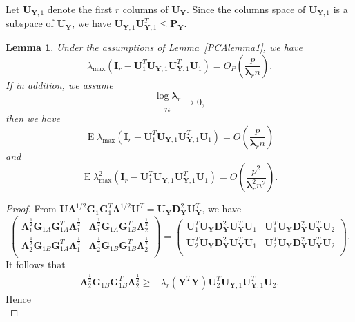 \documentclass[12pt]{article} %
\DeclareMathOperator{\myE}{E}
\newcommand{\bP}{\mathbf{P}}
\newcommand{\bY}{\mathbf{Y}}
\newcommand{\bG}{\mathbf{G}}
\newcommand{\bI}{\mathbf{I}}
\newcommand{\bU}{\mathbf{U}}
\newcommand{\bD}{\mathbf{D}}
\newcommand{\bfsym}[1]{\ensuremath{\boldsymbol{#1}}}
\def\blambda {\bfsym {\lambda}}
\def\bLambda {\bfsym {\Lambda}}
\newtheorem{lemma}{Lemma}
\theoremstyle{definition}
\begin{document}
\begin{appendices}
Let $\bU_{\bY,1}$ denote the first $r$ columns of $\bU_{\bY}$.
Since the columns space of $\bU_{\bY,1}$ is a subspace of $\bU_{\bY}$, we have $\bU_{\bY,1}\bU_{\bY,1}^T\leq \bP_{\bY}$.
\begin{lemma}\label{PCAlemma2}
    Under the assumptions of Lemma~\ref{PCAlemma1}, we have
$$
\lambda_{\max}(\bI_r-\bU_1^T \bU_{\bY,1}\bU_{\bY,1}^T \bU_1)
=O_P(\frac{ p}{\blambda_r n}).
$$
If in addition, we assume
    \begin{equation}\label{newCondition}
        \frac{\log \blambda_r}{n}\to 0,
    \end{equation}
     then we have
$$
\myE\lambda_{\max}(\bI_r-\bU_1^T \bU_{\bY,1}\bU_{\bY,1}^T \bU_1)
=O(\frac{ p}{\blambda_r n})
$$
and
$$
\myE\lambda_{\max}^2(\bI_r-\bU_1^T \bU_{\bY,1}\bU_{\bY,1}^T \bU_1)
=O(\frac{ p^2}{\blambda_r^2 n^2}).
$$
\end{lemma}
\begin{proof}
    From
$
\bU\bLambda^{1/2} \bG_1 \bG_1^T \bLambda^{1/2} \bU^T 
=\bU_{\bY}\bD_{\bY}^2 \bU_{\bY}^T
$,
we have
$$
    \begin{pmatrix}        
        \bLambda_{1}^{\frac{1}{2}}\bG_{1A} \bG_{1A}^T \bLambda_1^{\frac{1}{2}}&
        \bLambda_{1}^{\frac{1}{2}} \bG_{1A}\bG_{1B}^T\bLambda_2^{\frac{1}{2}}\\
        \bLambda_{2}^{\frac{1}{2}} \bG_{1B} \bG_{1A}^T\bLambda_1^{\frac{1}{2}} &
        \bLambda_{2}^{\frac{1}{2}}\bG_{1B}\bG_{1B}^T\bLambda_2^{\frac{1}{2}}\\
    \end{pmatrix}
    =
    \begin{pmatrix}        
         \bU_1^T \bU_{\bY}\bD_{\bY}^2 \bU_{\bY}^T \bU_1&
         \bU_1^T \bU_{\bY}\bD_{\bY}^2 \bU_{\bY}^T \bU_2\\
        \bU_2^T \bU_{\bY}\bD_{\bY}^2 \bU_{\bY}^T \bU_1&
         \bU_2^T \bU_{\bY}\bD_{\bY}^2 \bU_{\bY}^T \bU_2\\
    \end{pmatrix}.
$$
It follows that
$$
\begin{aligned}
 \bLambda_{2}^{\frac{1}{2}}\bG_{1B} \bG_{1B}^T  \bLambda_{2}^{\frac{1}{2}}
\geq&
    \lambda_r(\bY^T \bY) \bU_{2}^T \bU_{\bY,1}\bU_{\bY,1}^T \bU_{2}.
\end{aligned}
$$
Hence
    \begin{equation}\label{ineq:eigenvector}

\end{equation}
\end{proof}
\end{appendices}
\end{document}
